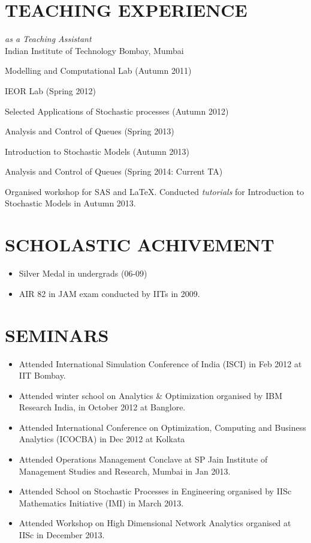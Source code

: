\documentclass[line,margin]{res}
\begin{document}
\begin{resume}
                
\section{TEACHING EXPERIENCE} {\sl as a Teaching Assistant} \\
                Indian Institute of Technology Bombay, Mumbai
                 \begin{itemize}  \itemsep -1pt %
  {\footnotesize               \item Modelling and Computational Lab {\scriptsize(Autumn 2011)}
                 \item IEOR Lab {\scriptsize(Spring 2012)}
                 \item Selected Applications of Stochastic processes {\scriptsize(Autumn 2012)}
                 \item Analysis and Control of Queues {\scriptsize(Spring 2013)}
                 \item Introduction to Stochastic Models {\scriptsize(Autumn 2013)}
                 \item Analysis and Control of Queues {\scriptsize(Spring 2014: Current TA)}}
                 \end{itemize} 
 Organised workshop for SAS and \LaTeX. Conducted \textit{tutorials} for Introduction to Stochastic Models in Autumn 2013.
 
 \section{SCHOLASTIC
ACHIVEMENT}
\begin{itemize}
\item Silver Medal in undergrads (06-09)
\item AIR 82 in JAM exam conducted by IITs in 2009.
\end{itemize}
\section{SEMINARS}
\begin{itemize}
\item Attended International Simulation Conference of India (ISCI) in Feb 2012 at
IIT Bombay.
\item Attended winter school on Analytics \& Optimization organised by IBM Research
India, in October 2012 at Banglore.
\item Attended International Conference on Optimization, Computing and Business Analytics (ICOCBA) in Dec 2012 at Kolkata
\item Attended Operations Management Conclave at SP Jain Institute of Management Studies and Research, Mumbai in Jan 2013.
\item Attended School on Stochastic Processes in Engineering organised by IISc
Mathematics Initiative (IMI) in March 2013.
\item Attended Workshop on High Dimensional Network Analytics organised at IISc in December 2013. 
\end{itemize}

\end{resume}
\end{document}
